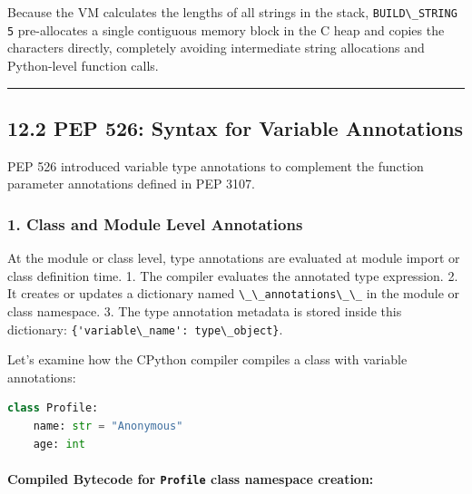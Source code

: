 Because the VM calculates the lengths of all strings in the stack,
\passthrough{\lstinline!BUILD\_STRING 5!} pre-allocates a single
contiguous memory block in the C heap and copies the characters
directly, completely avoiding intermediate string allocations and
Python-level function calls.

\begin{center}\rule{0.5\linewidth}{0.5pt}\end{center}

\hypertarget{pep-526-syntax-for-variable-annotations}{%
\subsection{12.2 PEP 526: Syntax for Variable
Annotations}\label{pep-526-syntax-for-variable-annotations}}

PEP 526 introduced variable type annotations to complement the function
parameter annotations defined in PEP 3107.

\hypertarget{class-and-module-level-annotations}{%
\subsubsection{1. Class and Module Level
Annotations}\label{class-and-module-level-annotations}}

At the module or class level, type annotations are evaluated at module
import or class definition time. 1. The compiler evaluates the annotated
type expression. 2. It creates or updates a dictionary named
\passthrough{\lstinline!\_\_annotations\_\_!} in the module or class
namespace. 3. The type annotation metadata is stored inside this
dictionary:
\passthrough{\lstinline!\{'variable\_name': type\_object\}!}.

Let's examine how the CPython compiler compiles a class with variable
annotations:

\begin{lstlisting}[language=Python]
class Profile:
    name: str = "Anonymous"
    age: int
\end{lstlisting}

\hypertarget{compiled-bytecode-for-profile-class-namespace-creation}{%
\paragraph{\texorpdfstring{Compiled Bytecode for \texttt{Profile} class
namespace
creation:}{Compiled Bytecode for Profile class namespace creation:}}\label{compiled-bytecode-for-profile-class-namespace-creation}}

